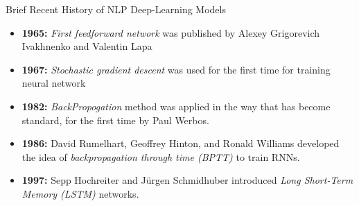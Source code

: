 \documentclass[10pt]{beamer}
\begin{document}
\begin{frame}[fragile]{Brief Recent History of NLP Deep-Learning Models}
	\begin{itemize}

		\item \textbf{1965:} \textit{First feedforward network} was published by Alexey Grigorevich Ivakhnenko and Valentin Lapa

		\item \textbf{1967:} \textit{Stochastic gradient descent} was used for the first time for training neural network

		\item \textbf{1982:} \textit{BackPropogation} method was applied in the way that has become standard, for the first time by Paul Werbos.

		\item \textbf{1986:} David Rumelhart, Geoffrey Hinton, and Ronald Williams developed the idea of
		      \textit{backpropagation through time (BPTT)} to train RNNs.


		\item \textbf{1997:} Sepp Hochreiter and Jürgen Schmidhuber introduced \textit{Long Short-Term Memory (LSTM)} networks.


	\end{itemize}
\end{frame}
\end{document}
